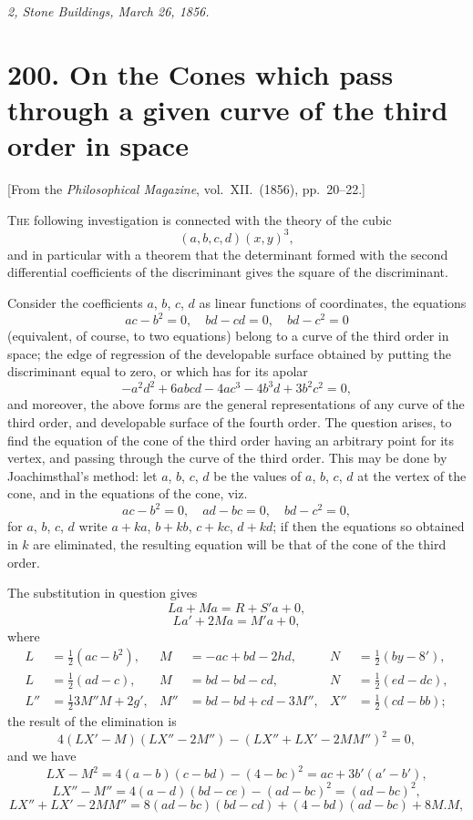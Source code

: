 \documentclass[11pt,a4paper]{book}
\begin{document}
\bigskip

\noindent\textit{2, Stone Buildings, March 26, 1856.}

\newpage


\section*{200. On the Cones which pass through a given curve of the third order in space}

\begin{center}
[From the \textit{Philosophical Magazine}, vol.~XII.~(1856), pp.~20--22.]
\end{center}

\bigskip

T\textsc{he} following investigation is connected with the theory of the cubic
\[
(a, b, c, d)(x, y)^3,
\]
and in particular with a theorem that the determinant formed with the second
differential coefficients of the discriminant gives the square of the discriminant.

Consider the coefficients $a$, $b$, $c$, $d$ as linear functions of coordinates, the equations
\[
ac - b^2 = 0,\quad bd - cd = 0,\quad bd - c^2 = 0
\]
(equivalent, of course, to two equations) belong to a curve of the third order in space;
the edge of regression of the developable surface obtained by putting the discriminant
equal to zero, or which has for its apolar
\[
-a^2d^2 + 6abcd - 4ac^3 - 4b^3d + 3b^2c^2 = 0,
\]
and moreover, the above forms are the general representations of any curve of the
third order, and developable surface of the fourth order. The question arises, to find
the equation of the cone of the third order having an arbitrary point for its vertex,
and passing through the curve of the third order. This may be done by Joachimsthal's
method: let $a$, $b$, $c$, $d$ be the values of $a$, $b$, $c$, $d$ at the vertex of the cone, and in
the equations of the cone, viz.
\[
ac - b^2 = 0,\quad ad - bc = 0,\quad bd - c^2 = 0,
\]
for $a$, $b$, $c$, $d$ write $a + ka$, $b + kb$, $c + kc$, $d + kd$; if then the equations so obtained
in $k$ are eliminated, the resulting equation will be that of the cone of the third order.

The substitution in question gives
\[
La + Ma = R + S' a + 0,
\]
\[
La' + 2Ma = M' a + 0,
\]
where
\begin{align*}
L &= \tfrac{1}{2}(ac - b^2),& M &= -ac + bd - 2hd,& N &= \tfrac{1}{2}(by - 8'),\\
L &= \tfrac{1}{2}(ad - c),& M &= bd - bd - cd,& N &= \tfrac{1}{2}(ed - dc),\\
L'' &= \tfrac{1}{2}3M''M + 2g',& M'' &= bd - bd + cd - 3M'',& X'' &= \tfrac{1}{2}(cd - bb);
\end{align*}
the result of the elimination is
\[
4(LX' - M)(LX'' - 2M'') - (LX'' + LX' - 2MM'')^2 = 0,
\]
and we have
\[
LX - M^2 = 4(a-b)(c-bd) - (4-bc)^2 = ac + 3b'(a'-b'),
\]
\[
LX'' - M'' = 4(a-d)(bd - ce) - (ad - bc)^2 = (ad - bc)^2,
\]
\[
LX'' + LX' - 2MM'' = 8(ad - bc)(bd - cd) + (4 - bd)(ad - bc) + 8M.M,
\]
\end{document}
